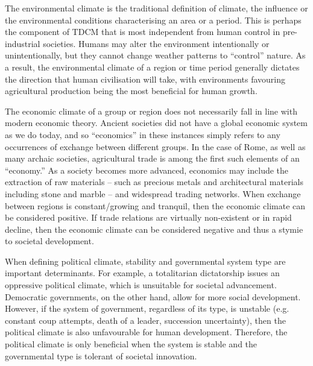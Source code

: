 The environmental climate is the traditional definition of climate, the influence or the environmental conditions characterising an area or a period. This is perhaps the component of TDCM that is most independent from human control in pre-industrial societies. Humans may alter the environment intentionally or unintentionally, but they cannot change weather patterns to “control” nature. As a result, the environmental climate of a region or time period generally dictates the direction that human civilisation will take, with environments favouring agricultural production being the most beneficial for human growth. 

The economic climate of a group or region does not necessarily fall in line with modern economic theory. Ancient societies did not have a global economic system as we do today, and so “economics” in these instances simply refers to any occurrences of exchange between different groups. In the case of Rome, as well as many archaic societies, agricultural trade is among the first such elements of an “economy.” As a society becomes more advanced, economics may include the extraction of raw materials – such as precious metals and architectural materials including stone and marble – and widespread trading networks. When exchange between regions is constant/growing and tranquil, then the economic climate can be considered positive. If trade relations are virtually non-existent or in rapid decline, then the economic climate can be considered negative and thus a stymie to societal development.

When defining political climate, stability and governmental system type are important determinants. For example, a totalitarian dictatorship issues an oppressive political climate, which is unsuitable for societal advancement. Democratic governments, on the other hand, allow for more social development. However, if the system of government, regardless of its type, is unstable (e.g. constant coup attempts, death of a leader, succession uncertainty), then the political climate is also unfavourable for human development. Therefore, the political climate is only beneficial when the system is stable and the governmental type is tolerant of societal innovation. 

